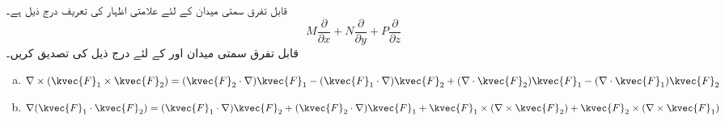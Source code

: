 قابل تفرق سمتی میدان  کے لئے علامتی اظہار   کی تعریف درج ذیل ہے۔
\[M\frac{\partial}{\partial x}+N\frac{\partial}{\partial y}+P\frac{\partial}{\partial z}\]
قابل تفرق سمتی میدان  اور  کے لئے درج ذیل کی تصدیق کریں۔
\begin{enumerate}[a.]
\item
\(\nabla\times(\kvec{F}_1\times\kvec{F}_2)=(\kvec{F}_2\cdot\nabla)\kvec{F}_1-(\kvec{F}_1\cdot\nabla)\kvec{F}_2+(\nabla\cdot\kvec{F}_2)\kvec{F}_1-(\nabla\cdot\kvec{F}_1)\kvec{F}_2\)
\item
\(\nabla(\kvec{F}_1\cdot\kvec{F}_2)=(\kvec{F}_1\cdot\nabla)\kvec{F}_2+(\kvec{F}_2\cdot\nabla)\kvec{F}_1+\kvec{F}_1\times(\nabla\times\kvec{F}_2)+\kvec{F}_2\times(\nabla\times\kvec{F}_1)\)
\end{enumerate}

